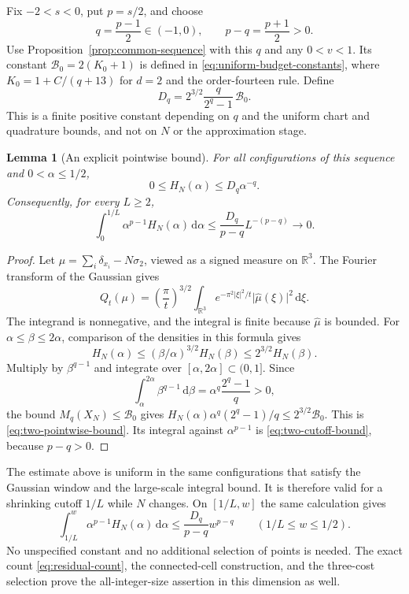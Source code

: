 \documentclass[11pt,a4paper]{article}
\newtheorem{lemma}[theorem]{Lemma}
\theoremstyle{definition}
\newcommand{\R}{\mathbb R}
\newcommand{\dd}{\,\mathrm d}
\newcommand{\abs}[1]{\lvert#1\rvert}
\numberwithin{equation}{section}
\begin{document}
Fix $-2<s<0$, put $p=s/2$, and choose
\[
 q=\frac{p-1}{2}\in(-1,0),\qquad p-q=\frac{p+1}{2}>0.
\]
Use Proposition~\ref{prop:common-sequence} with this $q$ and any $0<v<1$. Its constant $\mathcal B_0=2(K_0+1)$ is defined in \eqref{eq:uniform-budget-constants}, where $K_0=1+C/(q+13)$ for $d=2$ and the order-fourteen rule. Define
\begin{equation}\label{eq:two-D-constant}
 D_q=2^{3/2}\frac{q}{2^q-1}\,\mathcal B_0.
\end{equation}
This is a finite positive constant depending on $q$ and the uniform chart and quadrature bounds, and not on $N$ or the approximation stage.

\begin{lemma}[An explicit pointwise bound]\label{lem:two-pointwise-endpoint}
For all configurations of this sequence and $0<\alpha\le1/2$,
\begin{equation}\label{eq:two-pointwise-bound}
 0\le H_N(\alpha)\le D_q\alpha^{-q}.
\end{equation}
Consequently, for every $L\ge2$,
\begin{equation}\label{eq:two-cutoff-bound}
 \int_0^{1/L}\alpha^{p-1}H_N(\alpha)\dd\alpha
       \le\frac{D_q}{p-q}L^{-(p-q)}\longrightarrow0.
\end{equation}
\end{lemma}
\begin{proof}
Let $\mu=\sum_i\delta_{x_i}-N\sigma_2$, viewed as a signed measure on $\R^3$. The Fourier transform of the Gaussian gives
\[
 Q_t(\mu)=\left(\frac\pi t\right)^{3/2}
        \int_{\R^3}e^{-\pi^2\abs\xi^2/t}\abs{\widehat\mu(\xi)}^2\dd\xi.
\]
The integrand is nonnegative, and the integral is finite because $\widehat\mu$ is bounded. For $\alpha\le\beta\le2\alpha$, comparison of the densities in this formula gives
\begin{equation}\label{eq:doubling}
 H_N(\alpha)\le(\beta/\alpha)^{3/2}H_N(\beta)
                         \le2^{3/2}H_N(\beta).
\end{equation}
Multiply by $\beta^{q-1}$ and integrate over $[\alpha,2\alpha]\subset(0,1]$. Since
\[
 \int_\alpha^{2\alpha}\beta^{q-1}\dd\beta
       =\alpha^q\frac{2^q-1}{q}>0,
\]
the bound $M_q(X_N)\le\mathcal B_0$ gives
$H_N(\alpha)\alpha^q(2^q-1)/q\le2^{3/2}\mathcal B_0$.
This is \eqref{eq:two-pointwise-bound}. Its integral against $\alpha^{p-1}$ is \eqref{eq:two-cutoff-bound}, because $p-q>0$.
\end{proof}

The estimate above is uniform in the same configurations that satisfy the Gaussian window and the large-scale integral bound. It is therefore valid for a shrinking cutoff $1/L$ while $N$ changes. On $[1/L,w]$ the same calculation gives
\[
 \int_{1/L}^{w}\alpha^{p-1}H_N(\alpha)\dd\alpha
       \le\frac{D_q}{p-q}w^{p-q}\qquad(1/L\le w\le1/2).
\]
No unspecified constant and no additional selection of points is needed. The exact count \eqref{eq:residual-count}, the connected-cell construction, and the three-cost selection prove the all-integer-size assertion in this dimension as well.
\end{document}

